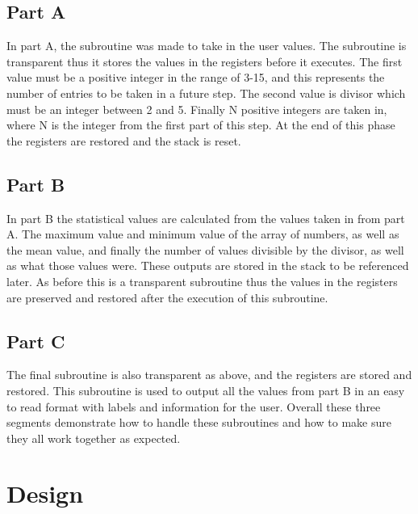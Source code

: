 \documentclass[letterpaper]{article}
\begin{document}
  \subsection{Part A}
  In part A, the subroutine was made to take in the user values. The subroutine is transparent thus it stores the values in the registers before it executes.  The first value must be a positive integer in the range of 3-15, and this represents the number of entries to be taken in a future step. The second value is divisor which must be an integer between 2 and 5. Finally N positive integers are taken in, where N is the integer from the first part of this step.  At the end of this phase the registers are restored and the stack is reset.
  \subsection{Part B}
  In part B the statistical values are calculated from the values taken in from part A.  The maximum value and minimum value of the array of numbers, as well as the mean value, and finally the number of values divisible by the divisor, as well as what those values were.  These outputs are stored in the stack to be referenced later.  As before this is a transparent subroutine thus the values in the registers are preserved and restored after the execution of this subroutine.
  \subsection{Part C}
  The final subroutine is also transparent as above, and the registers are stored and restored.  This subroutine is used to output all the values from part B in an easy to read format with labels and information for the user.  Overall these three segments demonstrate how to handle these subroutines and how to make sure they all work together as expected.

\newpage

\section{Design}
\end{document}
